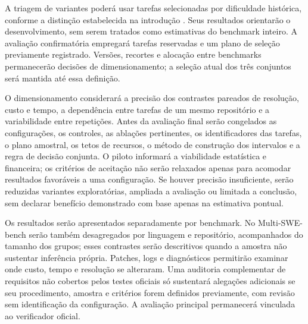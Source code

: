 A triagem de variantes poderá usar tarefas selecionadas por dificuldade histórica, conforme a distinção estabelecida na introdução \cite{Ndzomga2026EfficientBenchmarking}. Seus resultados orientarão o desenvolvimento, sem serem tratados como estimativas do benchmark inteiro. A avaliação confirmatória empregará tarefas reservadas e um plano de seleção previamente registrado. Versões, recortes e alocação entre benchmarks permanecerão decisões de dimensionamento; a seleção atual dos três conjuntos será mantida até essa definição.

O dimensionamento considerará a precisão dos contrastes pareados de resolução, custo e tempo, a dependência entre tarefas de um mesmo repositório e a variabilidade entre repetições. Antes da avaliação final serão congelados as configurações, os controles, as ablações pertinentes, os identificadores das tarefas, o plano amostral, os tetos de recursos, o método de construção dos intervalos e a regra de decisão conjunta. O piloto informará a viabilidade estatística e financeira; os critérios de aceitação não serão relaxados apenas para acomodar resultados favoráveis a uma configuração. Se houver precisão insuficiente, serão reduzidas variantes exploratórias, ampliada a avaliação ou limitada a conclusão, sem declarar benefício demonstrado com base apenas na estimativa pontual.

Os resultados serão apresentados separadamente por benchmark. No Multi-SWE-bench serão também desagregados por linguagem e repositório, acompanhados do tamanho dos grupos; esses contrastes serão descritivos quando a amostra não sustentar inferência própria. Patches, logs e diagnósticos permitirão examinar onde custo, tempo e resolução se alteraram. Uma auditoria complementar de requisitos não cobertos pelos testes oficiais só sustentará alegações adicionais se seu procedimento, amostra e critérios forem definidos previamente, com revisão sem identificação da configuração. A avaliação principal permanecerá vinculada ao verificador oficial.
